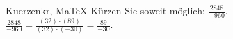 \begin{MAufgabe}{Kuerzen}{kr, MaTeX}
K\"urzen Sie soweit m\"oglich: $\frac{2848}{-960}$.\\ 
\ifLsg\MLoesung
\quad $\frac{2848}{-960}=\frac{(32)\cdot(89)}{(32)\cdot(-30)}=\frac{89}{-30}$.\else\relax\fi
 \end{MAufgabe}